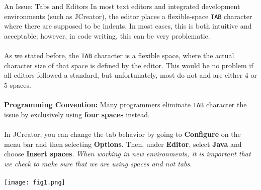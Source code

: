 \documentclass[11pt,oneside]{article}
\newenvironment{articleSection}[1]
{\begin{list}{}
         {\setlength{\leftmargin}{1cm}}
         \item[]
}
{\end{list}}
\begin{document}
\begin{articleSection}{0.5cm}
    \begin{subsection}{An Issue: Tabs and Editors}
    In most text editors and integrated development environments (such as JCreator), the editor places a flexible-space {\tt TAB} character where there are supposed to be indents. In most cases, this is both intuitive and acceptable; however, in code writing, this can be very problematic.\\
    \\
    As we stated before, the {\tt TAB} character is a flexible space, where the actual character size of that space is defined by the editor. This would be no problem if all editors followed a standard, but unfortunately, most do not and are either 4 or 5 spaces.\\
  \\ 
    {\bf Programming Convention:} Many programmers eliminate {\tt TAB} character the issue by exclusively using {\bf four spaces} instead.\\
\\
    In JCreator, you can change the tab behavior by going to {\bf Configure} on the menu bar and then selecting {\bf Options}. Then, under {\bf Editor}, select {\bf Java} and choose {\bf Insert spaces}. \emph{When working in new environments, it is important that we check to make sure that we are using spaces and not tabs.}\\
    \\
    \texttt{[image: fig1.png]}
    \end{subsection}
    
\end{articleSection}
\end{document}

